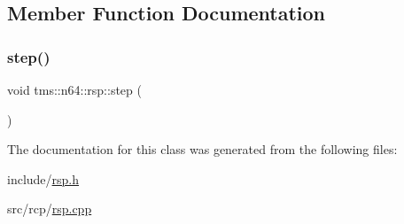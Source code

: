\subsection{Member Function Documentation}
\mbox{\label{classtms_1_1n64_1_1rsp_aed71289fe4b870da977610ce5769a23f}} 
\subsubsection{\texorpdfstring{step()}{step()}}
{\footnotesize\ttfamily void tms\+::n64\+::rsp\+::step (\begin{DoxyParamCaption}{ }\end{DoxyParamCaption})}



The documentation for this class was generated from the following files\+:\begin{DoxyCompactItemize}
\item 
include/\hyperlink{rsp_8h}{rsp.\+h}\item 
src/rcp/\hyperlink{rsp_8cpp}{rsp.\+cpp}\end{DoxyCompactItemize}
